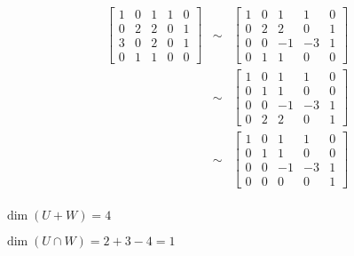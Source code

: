 \documentclass[letterpaper,12pt,fleqn]{article}
\begin{document}
\begin{example}
  \begin{eqnarray*}
    \begin{bmatrix}1 & 0 & 1 & 1 & 0 \\ 0 & 2 & 2 & 0 & 1 \\
      3 & 0 & 2 & 0 & 1 \\ 0 & 1 & 1 & 0 & 0\end{bmatrix} &\sim&
    \begin{bmatrix}1 & 0 & 1 & 1 & 0 \\ 0 & 2 & 2 & 0 & 1 \\
      0 & 0 & -1 & -3 & 1 \\ 0 & 1 & 1 & 0 & 0\end{bmatrix} \\
    &\sim& \begin{bmatrix}1 & 0 & 1 & 1 & 0 \\ 0 & 1 & 1 & 0 & 0 \\
      0 & 0 & -1 & -3 & 1 \\ 0 & 2 & 2 & 0 & 1\end{bmatrix} \\
    &\sim& \begin{bmatrix}1 & 0 & 1 & 1 & 0 \\ 0 & 1 & 1 & 0 & 0 \\
      0 & 0 & -1 & -3 & 1 \\ 0 & 0 & 0 & 0 & 1\end{bmatrix} \\
  \end{eqnarray*}

  $\dim(U+W)=4$

  $\dim(U\cap W)=2+3-4=1$
\end{example}
\end{document}
